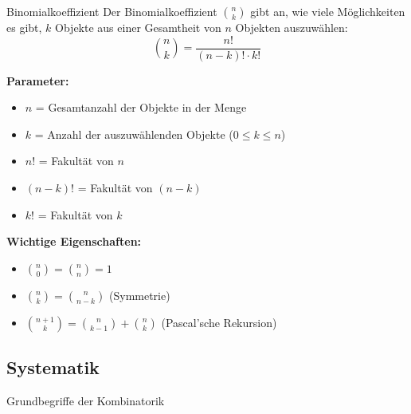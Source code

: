 \begin{definition}{Binomialkoeffizient}
Der Binomialkoeffizient $\binom{n}{k}$ gibt an, wie viele Möglichkeiten es gibt, $k$ Objekte aus einer Gesamtheit von $n$ Objekten auszuwählen:
$$
\binom{n}{k}=\frac{n!}{(n-k)!\cdot k!}
$$

\textbf{Parameter:}
\begin{itemize}
    \item $n$ = Gesamtanzahl der Objekte in der Menge
    \item $k$ = Anzahl der auszuwählenden Objekte ($0 \leq k \leq n$)
    \item $n!$ = Fakultät von $n$
    \item $(n-k)!$ = Fakultät von $(n-k)$
    \item $k!$ = Fakultät von $k$
\end{itemize}

\textbf{Wichtige Eigenschaften:}
\begin{itemize}
    \item $\binom{n}{0} = \binom{n}{n} = 1$
    \item $\binom{n}{k} = \binom{n}{n-k}$ (Symmetrie)
    \item $\binom{n+1}{k} = \binom{n}{k-1} + \binom{n}{k}$ (Pascal'sche Rekursion)
\end{itemize}
\end{definition}

\subsection{Systematik}
\begin{concept}{Grundbegriffe der Kombinatorik}
\begin{center}
\end{center}
\end{concept}

